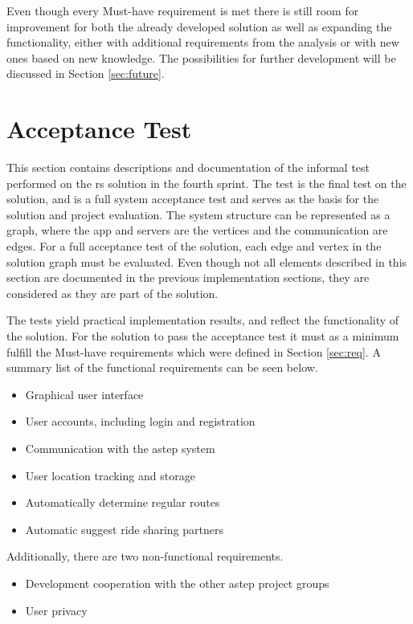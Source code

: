 Even though every Must-have requirement is met there is still room for improvement for both  the already developed solution as well as expanding the functionality, either with additional requirements from the analysis or with new ones based on new knowledge. 
The possibilities for further development will be discussed in Section \ref{sec:future}.

\iffalse
\section{Acceptance Test}
This section contains descriptions and documentation of the informal test performed on the \gls{rs} solution in the fourth sprint.
The test is the final test on the solution, and is a full system acceptance test and serves as the basis for the solution and project evaluation.
The system structure can be represented as a graph, where the app and servers are the vertices and the communication are edges. 
For a full acceptance test of the solution, each edge and vertex in the solution graph must be evaluated. 
Even though not all elements described in this section are documented in the previous implementation sections, they are considered as they are part of the solution.

The tests yield practical implementation results, and reflect the functionality of the solution.
For the solution to pass the acceptance test it must as a minimum fulfill the Must-have requirements which were defined in Section \ref{sec:req}.
A summary list of the functional requirements can be seen below.
\begin{itemize}
	\item Graphical user interface
	\item User accounts, including login and registration
	\item Communication with the \gls{astep} system
	\item User location tracking and storage
	\item Automatically determine regular routes
	\item Automatic suggest ride sharing partners
\end{itemize}

Additionally, there are two non-functional requirements.
\begin{itemize}
	\item Development cooperation with the other \gls{astep} project groups
	\item User privacy
\end{itemize}

